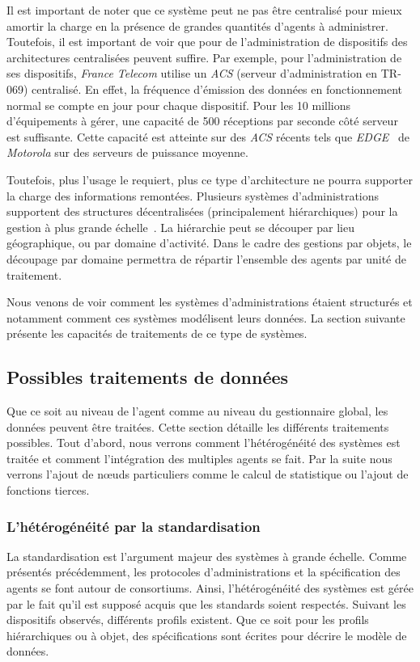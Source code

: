 Il est important de noter que ce système peut ne pas être centralisé pour mieux amortir la charge en la présence de grandes quantités d'agents à administrer. Toutefois, il est important de voir que pour de l'administration de dispositifs des architectures centralisées peuvent suffire. Par exemple, pour l'administration de ses dispositifs, \textit{France Telecom} utilise un \textit{ACS} (serveur d'administration en TR-069) centralisé. En effet, la fréquence d'émission des données en fonctionnement normal se compte en jour pour chaque dispositif. Pour les 10 millions d'équipements à gérer, une capacité de 500 réceptions par seconde côté serveur est suffisante. Cette capacité est atteinte sur des \textit{ACS} récents tels que \textit{EDGE}~\cite{Motorola:EDGE} de \textit{Motorola} sur des serveurs de puissance moyenne.

Toutefois, plus l'usage le requiert, plus ce type d'architecture ne pourra supporter la charge des informations remontées. Plusieurs systèmes d'administrations supportent des structures décentralisées (principalement hiérarchiques) pour la gestion à plus grande échelle~\cite{Kessis:management}. La hiérarchie peut se découper par lieu géographique, ou par domaine d'activité. Dans le cadre des gestions par objets, le découpage par domaine permettra de répartir l'ensemble des agents par unité de traitement.

Nous venons de voir comment les systèmes d'administrations étaient structurés et notamment comment ces systèmes modélisent leurs données. La section suivante présente les capacités de traitements de ce type de systèmes.

\subsection{Possibles traitements de données}
Que ce soit au niveau de l'agent comme au niveau du gestionnaire global, les données peuvent être traitées. Cette section détaille les différents traitements possibles. Tout d'abord, nous verrons comment l'hétérogénéité des systèmes est traitée et comment l'intégration des multiples agents se fait. Par la suite nous verrons l'ajout de nœuds particuliers comme le calcul de statistique ou l'ajout de fonctions tierces.

\subsubsection{L'hétérogénéité par la standardisation}
La standardisation est l'argument majeur des systèmes à grande échelle. Comme présentés précédemment, les protocoles d'administrations et la spécification des agents se font autour de consortiums. Ainsi, l'hétérogénéité des systèmes est gérée par le fait qu'il est supposé acquis que les standards soient respectés. Suivant les dispositifs observés, différents profils existent. Que ce soit pour les profils hiérarchiques ou à objet, des spécifications sont écrites pour décrire le modèle de données.

